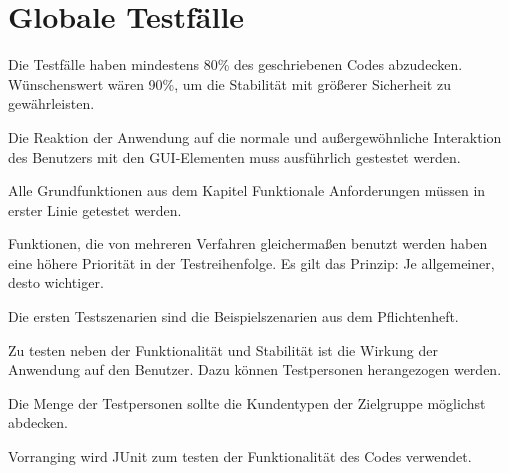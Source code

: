 \documentclass{article}
\begin{document}
\section{Globale Testfälle}
\begin{T}[start = 10]
\item Die Testfälle haben mindestens 80\% des geschriebenen Codes abzudecken. Wünschenswert wären 90\%,
      um die Stabilität mit größerer Sicherheit zu gewährleisten.
\end{T}

\begin{T}[start = 10]
 \item Die Reaktion der Anwendung auf die normale und außergewöhnliche Interaktion des Benutzers mit 
       den GUI-Elementen muss ausführlich gestestet werden.
\end{T}

\begin{T}[start = 10]
 \item Alle Grundfunktionen aus dem Kapitel Funktionale Anforderungen müssen in erster Linie getestet werden.
\end{T}

\begin{T}[start = 10]
 \item Funktionen, die von mehreren Verfahren gleichermaßen benutzt werden haben eine höhere Priorität in der Testreihenfolge.
       Es gilt das Prinzip: Je allgemeiner, desto wichtiger.
\end{T}

\begin{T}[start = 10]
 \item Die ersten Testszenarien sind die Beispielszenarien aus dem Pflichtenheft.
\end{T}

\begin{T}[start = 10]
 \item Zu testen neben der Funktionalität und Stabilität ist die Wirkung der Anwendung auf den Benutzer. 
       Dazu können Testpersonen herangezogen werden.
\end{T}

\begin{T}[start = 10]
 \item Die Menge der Testpersonen sollte die Kundentypen der Zielgruppe möglichst abdecken.
\end{T}

\begin{T}[start = 10]
 \item Vorranging wird JUnit zum testen der Funktionalität des Codes verwendet.
\end{T}
\end{document}
